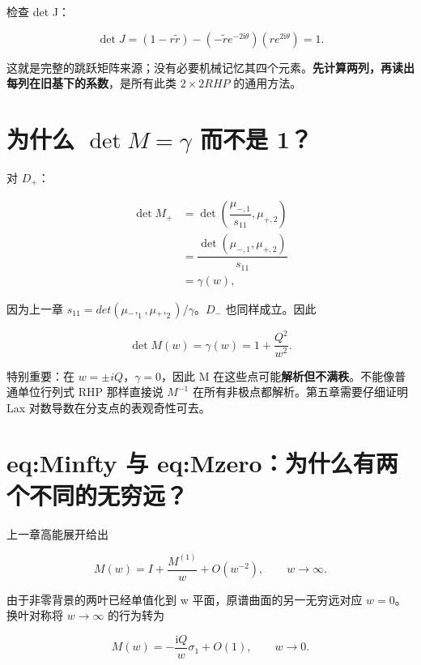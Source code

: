 检查 det J：\par

\[
\det J
=(1-r\widetilde r)
-(-\widetilde r e^{-2\mathrm{i}\theta})(r e^{2\mathrm{i}\theta})
=1.
\]

这就是完整的跳跃矩阵来源；没有必要机械记忆其四个元素。\textbf{先计算两列，再读出每列在旧基下的系数}，是所有此类 $2\times{}2 RHP$ 的通用方法。\par

\section{为什么 \texorpdfstring{$\det M=\gamma$}{det M=gamma} 而不是 1？}
\par

对 $D_{+}$：\par

\[
\begin{aligned}
\det M_+
&=\det\left(\dfrac{\mu_{-,1}}{s_{11}},\mu_{+,2}\right)\\
&=\dfrac{\det(\mu_{-,1},\mu_{+,2})}{s_{11}}\\
&=\gamma(w),
\end{aligned}
\]

因为上一章 $s_{11}=det(\mu{}_{-},_{1},\mu{}_{+},_{2})/\gamma{}$。$D_{-}$ 也同样成立。因此\par

\[
\det M(w)=\gamma(w)=1+\dfrac{Q^2}{w^2}.
\]

特别重要：在 $w=\pm{}iQ$，$\gamma{}=0$，因此 M 在这些点可能\textbf{解析但不满秩}。不能像普通单位行列式 RHP 那样直接说 $M^{-1}$ 在所有非极点都解析。第五章需要仔细证明 Lax 对数导数在分支点的表观奇性可去。\par

\section{eq:Minfty 与 eq:Mzero：为什么有两个不同的无穷远？}

上一章高能展开给出\par

\[
M(w)=I+\dfrac{M^{(1)}}{w}+O(w^{-2}),
\qquad w\to\infty.
\]

由于非零背景的两叶已经单值化到 w 平面，原谱曲面的另一无穷远对应 $w=0$。换叶对称将 $w\to{}\infty{}$ 的行为转为\par

\[
M(w)=-\dfrac{\mathrm{i}Q}{w}\sigma_1+O(1),
\qquad w\to0.
\]

